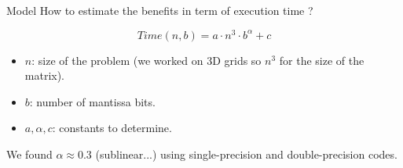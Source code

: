 \documentclass[hyperref={pdfpagelabels=false}]{beamer}
\begin{document}
\begin{frame}{Model}
 How to estimate the benefits in term of execution time ?
 \pause
 \vspace{0.5cm}

 \[ Time(n,b) = a\cdot n^3 \cdot b^\alpha + c \]

 \begin{itemize}
    \item $n$: size of the problem (we worked on 3D grids so $n^3$ for the size of the matrix).
    \item $b$: number of mantissa bits.
    \item $a,\alpha,c$: constants to determine.
 \end{itemize}

 We found \textbf{$\alpha \approx 0.3$} (sublinear...) using single-precision and double-precision codes.

\end{frame}
\end{document}
